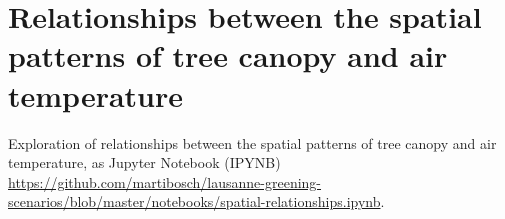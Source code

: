 \documentclass[12pt]{iopart}
\begin{document}
\begin{table}
\end{table}


\section{Relationships between the spatial patterns of tree canopy and air temperature}
\label{sec:spatial-relationships}

Exploration of relationships between the spatial patterns of tree canopy and air temperature, as Jupyter Notebook (IPYNB) \url{https://github.com/martibosch/lausanne-greening-scenarios/blob/master/notebooks/spatial-relationships.ipynb}.



\end{document}
